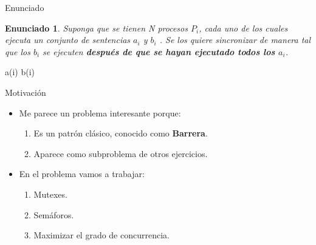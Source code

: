 \documentclass[pdf]{beamer}
\newtheorem{enun}{Enunciado}
\begin{document}
\begin{frame}{Enunciado}

\begin{enun}
    Suponga que se tienen N procesos $P_i$, cada uno de los cuales ejecuta un conjunto de sentencias $a_i$
y $b_i$ . Se los quiere sincronizar de manera tal que los $b_i$ se ejecuten \textbf{después de que se hayan ejecutado
todos los $a_i$}.

\end{enun}

\pause

\begin{algorithmic}

     
        \State a(i)
        \vspace{1em}
        \State b(i)
        \vspace{1em}
        
    \EndFunction
\end{algorithmic}
    

\end{frame}

\begin{frame}{Motivación}
    \begin{itemize}
    \item Me parece un problema interesante porque:
        \begin{enumerate}
            \vspace{1em}
            \item Es un patrón clásico, conocido como \textbf{Barrera}.
            \vspace{1em}
            \item Aparece como subproblema de otros ejercicios.
        \end{enumerate}
    \vspace{2em}
    \item En el problema vamos a trabajar:
        \begin{enumerate}
            \vspace{1em}
            \item Mutexes.
            \vspace{1em}
            \item Semáforos.
            \vspace{1em}
            \item Maximizar el grado de concurrencia.
        \end{enumerate}
        
    \end{itemize}
\end{frame}
\end{document}
